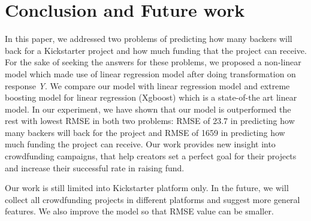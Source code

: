 \section{Conclusion and Future work}
In this paper, we addressed two problems of predicting how many backers will back for a Kickstarter project and how much funding that the project can receive. For the sake of seeking the answers for these problems, we proposed a non-linear model which made use of linear regression model after doing transformation on response \emph{Y}. We compare our model with linear regression model and extreme boosting model for linear regression (Xgboost) which is a state-of-the art linear model. In our experiment, we have shown that our model is outperformed the rest with lowest RMSE in both two problems: RMSE of 23.7 in predicting how many backers will back for the project and RMSE of 1659 in predicting how much funding the project can receive. Our work provides new insight into crowdfunding campaigns, that help creators set a perfect goal for their projects and increase their successful rate in raising fund.

Our work is still limited into Kickstarter platform only. In the future, we will collect all crowdfunding projects in different platforms and suggest more general features. We also improve the model so that RMSE value can be smaller.